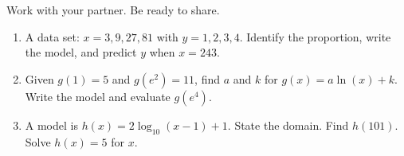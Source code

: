 \documentclass[aspectratio=169, 11pt]{beamer}
\begin{document}
\begin{frame}[t, plain]

  \vspace{0.3cm}
  Work with your partner. Be ready to share.

  \vspace{0.3cm}
  \begin{enumerate}
    \setlength{\itemsep}{10pt}
    \item A data set: $x = 3, 9, 27, 81$ with $y = 1, 2, 3, 4$. Identify the proportion,
          write the model, and predict $y$ when $x = 243$.

    \item Given $g(1) = 5$ and $g(e^2) = 11$, find $a$ and $k$ for $g(x) = a\ln(x) + k$.
          Write the model and evaluate $g(e^4)$.

    \item A model is $h(x) = 2\log_{10}(x-1)+1$. State the domain. Find $h(101)$.
          Solve $h(x) = 5$ for $x$.
  \end{enumerate}
\end{frame}
\end{document}
